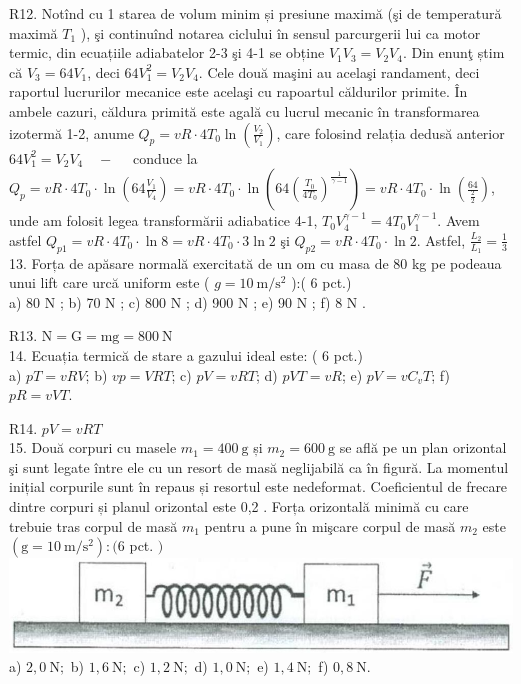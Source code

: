 R12. Notînd cu 1 starea de volum minim și presiune maximă (şi de temperatură maximă $T_{1}$ ), şi continuînd notarea ciclului în sensul parcurgerii lui ca motor termic, din ecuațiile adiabatelor 2-3 şi 4-1 se obține $V_{1} V_{3}=V_{2} V_{4}$. Din enunţ știm că $V_{3}=64 V_{1}$, deci $64 V_{1}^{2}=V_{2} V_{4}$. Cele două maşini au acelaşi randament, deci raportul lucrurilor mecanice este acelaşi cu rapoartul căldurilor primite. În ambele cazuri, căldura primită este agală cu lucrul mecanic în transformarea izotermă 1-2, anume $Q_{p}=v R \cdot 4 T_{0} \ln \left(\frac{V_{2}}{V_{1}}\right)$, care folosind relația dedusă anterior $64 V_{1}^{2}=V_{2} V_{4} \quad-\quad$ conduce la $Q_{p}=v R \cdot 4 T_{0} \cdot \ln \left(64 \frac{V_{1}}{V_{4}}\right)=v R \cdot 4 T_{0} \cdot \ln \left(64\left(\frac{T_{0}}{4 T_{0}}\right)^{\frac{1}{\gamma-1}}\right)=v R \cdot 4 T_{0} \cdot \ln \left(\frac{64}{\frac{2}{2}}\right)$, unde am folosit legea transformării adiabatice 4-1, $T_{0} V_{4}^{\gamma-1}=4 T_{0} V_{1}^{\gamma-1}$. Avem astfel $Q_{p 1}=v R \cdot 4 T_{0} \cdot \ln 8=v R \cdot 4 T_{0} \cdot 3 \ln 2$ şi $Q_{p 2}=v R \cdot 4 T_{0} \cdot \ln 2$. Astfel, $\frac{L_{2}}{L_{1}}=\frac{1}{3}$\\
13. Forța de apăsare normală exercitată de un om cu masa de 80 kg pe podeaua unui lift care urcă uniform este ( $g=10 \mathrm{~m} / \mathrm{s}^{2}$ ):( 6 pct.)\\
a) 80 N ; b) 70 N ; c) 800 N ; d) 900 N ; e) 90 N ; f) 8 N .

R13. $\mathrm{N}=\mathrm{G}=\mathrm{mg}=800 \mathrm{~N}$\\
14. Ecuația termică de stare a gazului ideal este: ( 6 pct.)\\
a) $p T=v R V$; b) $v p=V R T$; c) $p V=v R T$; d) $p V T=v R$; e) $p V=v C_{v} T$; f) $p R=v V T$.

R14. $p V=v R T$\\
15. Două corpuri cu masele $m_{1}=400 \mathrm{~g}$ și $m_{2}=600 \mathrm{~g}$ se află pe un plan orizontal şi sunt legate între ele cu un resort de masă neglijabilă ca în figură. La momentul inițial corpurile sunt în repaus și resortul este nedeformat. Coeficientul de frecare dintre corpuri și planul orizontal este 0,2 . Forța orizontală minimă cu care trebuie tras corpul de masă $m_{1}$ pentru a pune în mişcare corpul de masă $m_{2}$ este $\left(\mathrm{g}=10 \mathrm{~m} / \mathrm{s}^{2}\right):(6$ pct. $)$\\
\includegraphics[width=0.4\linewidth]{images/2025_08_19_7d65f00c22d2f38e2422g-11}\\
a) $2,0 \mathrm{~N} ;$ b) $1,6 \mathrm{~N} ;$ c) $1,2 \mathrm{~N} ;$ d) $1,0 \mathrm{~N} ;$ e) $1,4 \mathrm{~N} ;$ f) $0,8 \mathrm{~N}$.

